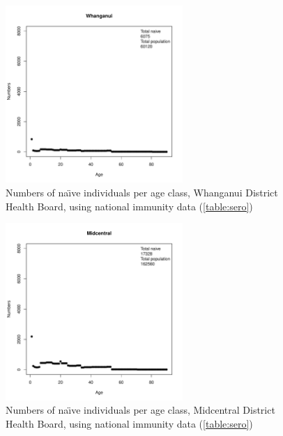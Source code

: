 \documentclass{article}
\begin{document}
\begin{figure}[H]
     \begin{center}
     \includegraphics[width=0.6\textwidth]{dhb11.pdf}
     \end{center}
     \caption{Numbers of na\"{\i}ve individuals per age class, Whanganui District Health Board, using national immunity data (\autoref{table:sero})}
     \label{fig:Whanganui}
\end{figure}

\begin{figure}[H]
     \begin{center}
     \includegraphics[width=0.6\textwidth]{dhb12.pdf}
     \end{center}
     \caption{Numbers of na\"{\i}ve individuals per age class, Midcentral District Health Board, using national immunity data (\autoref{table:sero})}
     \label{fig:Midcentral}
\end{figure}
\end{document}
